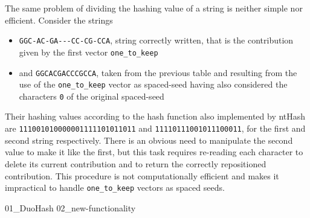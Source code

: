 \begin{example}
	The same problem of dividing the hashing value of a string is neither simple nor efficient. Consider the strings \begin{itemize}
		\item \verb|GGC-AC-GA---CC-CG-CCA|, string correctly written, that is the contribution given by the first vector \verb|one_to_keep|
		\item and \verb|GGCACGACCCGCCA|, taken from the previous table and resulting from the use of the \verb|one_to_keep| vector as spaced-seed having also considered the characters \texttt{0} of the original spaced-seed
	\end{itemize} Their hashing values according to the hash function also implemented by ntHash are \verb|111001010000001111101011011| and \verb|11110111001011100011|, for the first and second string respectively. There is an obvious need to manipulate the second value to make it like the first, but this task requires re-reading each character to delete its current contribution and to return the correctly repositioned contribution. This procedure is not computationally efficient and makes it impractical to handle \verb|one_to_keep| vectors as spaced seeds.
\end{example}

{01_DuoHash}
{02_new-functionality}
